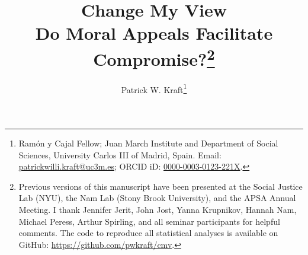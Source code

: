 \documentclass[12pt]{article}
\author{Patrick W. Kraft\footnote{Ramón y Cajal Fellow; Juan March Institute and Department of Social Sciences, University Carlos III of Madrid, Spain. Email: \href{mailto:patrickwilli.kraft@uc3m.es}{patrickwilli.kraft@uc3m.es}; ORCID iD: \href{https://orcid.org/0000-0003-0123-221X}{0000-0003-0123-221X}.}}
\title{Change My View\\
\large{Do Moral Appeals Facilitate Compromise?}\footnote{Previous versions of this manuscript have been presented at the Social Justice Lab (NYU), the Nam Lab (Stony Brook University), and the APSA Annual Meeting. I thank Jennifer Jerit, John Jost, Yanna Krupnikov, Hannah Nam, Michael Peress, Arthur Spirling, and all seminar participants for helpful comments. The code to reproduce all statistical analyses is available on GitHub: \url{https://github.com/pwkraft/cmv}.
}}
\date{}
\begin{document}
\maketitle
\doublespacing
\thispagestyle{empty}

\vfill
\begin{abstract}\singlespacing
\noindent 
\end{abstract}
\vfill

\newpage\setcounter{page}{1}


\clearpage
\singlespacing


\end{document}
